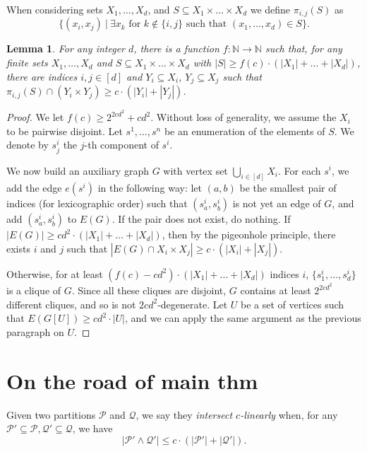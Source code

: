 \documentclass[11pt]{article}
\newtheorem{lemma}[theorem]{Lemma}
\theoremstyle{definition}
\newcommand{\QQ}{{\mathcal Q}}
\newcommand{\PP}{{\mathcal P}}
\newcommand{\N}{\mathbb{N}}
\newcommand{\inducedSS}[2]{#1/#2}%
\renewcommand{\le}{\leqslant}
\renewcommand{\ge}{\geqslant}
\renewcommand{\subset}{\subseteq}
\newcommand{\remph}[1]{{\color{red} \emph{#1}}}
\begin{document}
When considering sets $X_1, \dots, X_d$, and $S \subseteq X_1 \times \dots \times X_d$ we define $\pi_{i, j}(S)$ as
\[
\{(x_i, x_j)~|~\exists x_k \text{ for } k \not \in \{i, j\} \text{ such that } (x_1, \dots, x_d) \in S\}.
\]
\begin{lemma}\label{lem:projection}
For any integer $d$, there is a function $f : \N \to \N$ such that, for any finite sets $X_1, \dots, X_d$ and $S \subseteq X_1 \times \dots \times X_d$ with $|S| \ge f(c) \cdot (|X_1| + \dots + |X_d|)$,
there are indices $i, j \in [d]$ and $Y_i \subset X_i$, $Y_j \subset X_j$ such that $\pi_{i, j}(S) \cap (Y_i \times Y_j) \ge c \cdot (|Y_i| + |Y_j|)$.
\end{lemma}
\begin{proof}
  We let $f(c) \ge 2^{2c d^2} + c d^2$.
  Without loss of generality, we assume the $X_i$ to be pairwise disjoint.
  Let $s^1, \dots, s^n$ be an enumeration of the elements of $S$.
  We denote by $s^i_j$ the $j$-th component of $s^i$.

  We now build an auxiliary graph $G$ with vertex set $\bigcup_{i \in [d]} X_i$.
  For each $s^i$, we add the edge $e(s^i)$ in the following way: let $(a, b)$ be the smallest pair of indices (for lexicographic order) such that $(s^i_a, s^i_b)$ is not yet an edge of $G$, and add $(s^i_a, s^i_b)$ to $E(G)$. If the pair does not exist, do nothing.
  If $|E(G)| \ge c d^2 \cdot (|X_1| + \dots + |X_d|)$, then by the pigeonhole principle, there exists $i$ and $j$ such that $|E(G) \cap X_i \times X_j| \ge c \cdot (|X_i| + |X_j|)$.

  Otherwise, for at least  $(f(c) - c d^2) \cdot (|X_1| + \dots + |X_d|)$ indices $i$, $\{s^i_1, \dots, s^i_d\}$ is a clique of $G$. Since all these cliques are disjoint, $G$ contains at least $2^{2c d^2}$ different cliques, and so is not $2c d^2$-degenerate.
  Let $U$ be a set of vertices such that $E(G[U]) \ge c d^2 \cdot |U|$, and we can apply the same argument as the previous paragraph on $U$. 
\end{proof}


\section{On the road of main thm}
\newcommand{\twins}[2]{\text{twins}(\inducedSS{#1}{#2})}

Given two partitions $\PP$ and $\QQ$, we say they \remph{intersect $c$-linearly} when, for any $\PP' \subseteq \PP, \QQ' \subseteq \QQ$, we have 
\[
|\PP' \wedge \QQ'| \le c \cdot (|\PP'| + |\QQ'|).
\]
\end{document}
